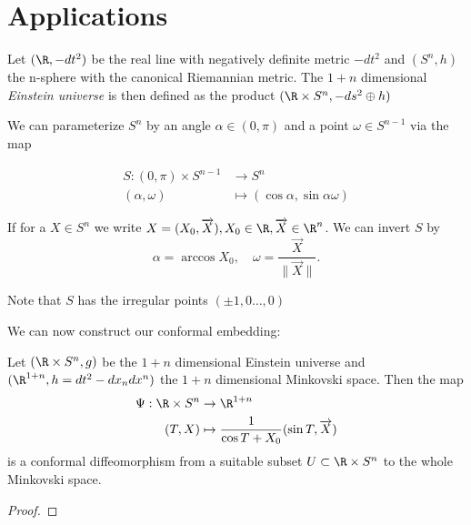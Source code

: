 \section{Applications}

\begin{definition}
Let $(\R,-dt^2)$ be the real line with negatively definite metric $-dt^2$ and $(S^n,h)$ the n-sphere with the canonical Riemannian metric. The $1+n$ dimensional \emph{Einstein universe} is then defined as the product $(\R\times S^n, -ds^2 \oplus h)$
\end{definition}

\begin{remark}
We can parameterize $S^n$ by an angle $\alpha\in (0,\pi)$ and a point $\omega\in S^{n-1}$ via the map 

\begin{align*}
    S:(0,\pi)\times S^{n-1}&\to S^n \\
    (\alpha,\omega) &\mapsto (\cos \alpha, \sin \alpha \omega)
\end{align*}

If for a $X\in S^n$ we write $X=(X_0,\overrightarrow{X}), X_0\in \R, \overrightarrow{X}\in \R^n$. We can invert $S$ by 
\[
    \alpha = \arccos X_0, \quad \omega=\frac{\overrightarrow{X}}{\lVert\overrightarrow{X}\rVert}.
\]

Note that $S$ has the irregular points $(\pm 1,0\dots,0)$
\end{remark}

We can now construct our conformal embedding:

\begin{proposition}
Let $(\R\times S^n,g)$ be the $1+n$ dimensional Einstein universe and $(\R^{1+n},h=dt^2-dx_ndx^n)$ the $1+n$ dimensional Minkovski space. Then the map 
\begin{align}
    \Psi:\R\times S^n &\to \R^{1+n}\\
    (T,X) &\mapsto\frac{1}{\cos T + X_0}(\sin T,\overrightarrow{X})
\end{align}
is a conformal diffeomorphism from a suitable subset $U\subset \R\times S^n$ to the whole Minkovski space.
\end{proposition}
\begin{proof}
\end{proof}

